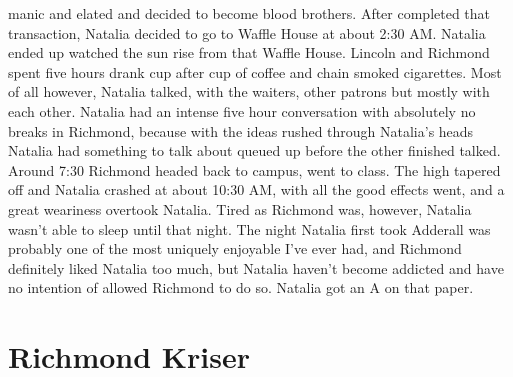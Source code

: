 \documentclass[12pt]{book}
\begin{document}
manic and elated and decided to become blood brothers. After completed that transaction, Natalia decided to go to Waffle House at about 2:30 AM. Natalia ended up watched the sun rise from that Waffle House. Lincoln and Richmond spent five hours drank cup after cup of coffee and chain smoked cigarettes. Most of all however, Natalia talked, with the waiters, other patrons but mostly with each other. Natalia had an intense five hour conversation with absolutely no breaks in Richmond, because with the ideas rushed through Natalia's heads Natalia had something to talk about queued up before the other finished talked. Around 7:30 Richmond headed back to campus, went to class. The high tapered off and Natalia crashed at about 10:30 AM, with all the good effects went, and a great weariness overtook Natalia. Tired as Richmond was, however, Natalia wasn't able to sleep until that night. The night Natalia first took Adderall was probably one of the most uniquely enjoyable I've ever had, and Richmond definitely liked Natalia too much, but Natalia haven't become addicted and have no intention of allowed Richmond to do so. Natalia got an A on that paper.



\chapter{Richmond Kriser}
\end{document}
